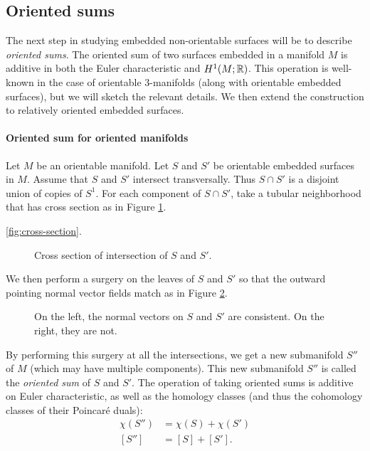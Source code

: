 \subsection{Oriented sums}
\label{sec:oriented-sums}

The next step in studying embedded non-orientable surfaces will be to describe \emph{oriented sums}.
The oriented sum of two surfaces embedded in a manifold $M$ is additive in both the Euler characteristic and $H^1(M;\mathbb{R})$.
This operation is well-known in the case of orientable $3$-manifolds (along with orientable embedded surfaces), but we will sketch the relevant details.
We then extend the construction to relatively oriented embedded surfaces.

\paragraph{Oriented sum for oriented manifolds}
Let $M$ be an orientable manifold.
Let $S$ and $S'$ be orientable embedded surfaces in $M$.
Assume that $S$ and $S'$ intersect transversally.
Thus $S \cap S'$ is a disjoint union of copies of $S^1$.
For each component of $S\cap S'$, take a tubular neighborhood that has cross section as in Figure \ref{fig:cross-section}.

\autoref{fig:cross-section}.
\begin{figure}
  \centering
  \caption{Cross section of intersection of $S$ and $S'$.}
  \label{fig:cross-section}
\end{figure}



We then perform a surgery on the leaves of $S$ and $S'$ so that the outward pointing normal vector fields match as in Figure \ref{fig:surgery}.
\begin{figure}
  \centering
  \caption{On the left, the normal vectors on $S$ and $S'$ are consistent. On the right, they are not.}
  \label{fig:surgery}
\end{figure}

By performing this surgery at all the intersections, we get a new submanifold $S''$ of $M$ (which may have multiple components).
This new submanifold $S''$ is called the {\it oriented sum} of $S$ and $S'$.
The operation of taking oriented sums is additive on Euler characteristic, as well as the homology classes (and thus the cohomology classes of their Poincar\'e duals):
\begin{align*}
  \chi(S'') &= \chi(S) + \chi(S') \\
  [S''] &= [S] + [S'].
\end{align*}

